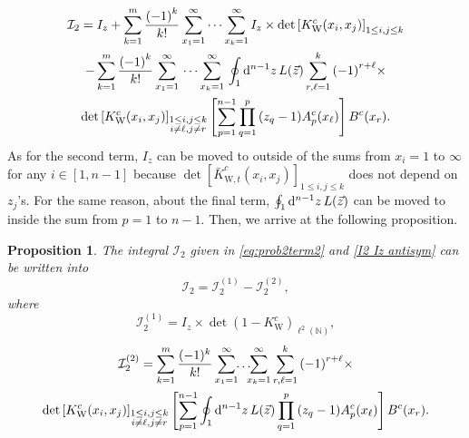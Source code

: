 \documentclass[cmp]{svjour}
\numberwithin{theorem}{section}
\numberwithin{equation}{section}
\def\dd{{\rm d}}
\newtheorem{prop}[theorem]{Proposition}
\begin{document}
\begin{multline*}
\label{detdivide_3}
\mathcal{I}_2 =  I_z + \sum_{k=1}^{m}{ \frac{{(-1)}^k}{k!} } \sum_{x_1 = 1}^{\infty}{  \cdots \sum_{x_k = 1}^{\infty}{ I_z \times \det\left[  K^c_{\mathrm{W}}(x_i , x_j) \right]_{1 \leq i , j \leq k}   }  } \\
-  \sum_{k=1}^{m}{ \frac{{(-1)}^k}{k!} } \sum_{x_1 = 1}^{\infty}{ } \cdots \sum_{x_k = 1}^{\infty}{ } \oint_1 \dd^{n-1} z\,  L(\vec{z}) \sum_{r, \ell =1}^{k}{   {(-1)}^{r+\ell} } \times \\
\det\left[  K^c_{\mathrm{W}}(x_i , x_j) \right]_{ \substack{ 1 \leq i , j \leq k \\  i \neq \ell , j \neq r } }  \left[ \sum_{p=1}^{n-1}{ \prod_{q=1}^{p}{ {(z_q - 1)} A^c_{p}(x_\ell) }} \right]  B^c(x_r) .
\end{multline*}
As for the second term, $I_z$ can be moved to outside of the sums from $x_i = 1$ to $\infty$ for any $i \in [1, n-1]$ because $\det\left[  \bar{K}^c_{\mathrm{W},t}(x_i , x_j) \right]_{1 \leq i , j \leq k}$ does not depend on $z_j$'s.
For the same reason, about the final term, $\oint_1 \dd^{n-1} z\,  L(\vec{z})$ can be moved to inside the sum from $p=1$ to $n-1$.
Then, we arrive at the following proposition.

\medskip


\begin{prop}
The integral $\mathcal{I}_2$ given in \eqref{eq:prob2term2} and \eqref{I2 Iz antisym} can be written into
\begin{equation}
\mathcal{I}_2=\mathcal{I}^{(1)}_2 - \mathcal{I}^{(2)}_2,
\label{I2div}
\end{equation}
where
\begin{equation}
\mathcal{I}^{(1)}_2 = 
I_z \times {\det\left( 1 - K^c_{\mathrm{W}} \right)}_{\ell^2(\mathbb{N})},
\label{def:I2(1)}
\end{equation}
\begin{multline}
\mathcal{I}^{(2)}_2 =  \sum_{k=1}^{m} \frac{(-1)^k}{ k! }
\sum_{x_1 = 1}^{\infty} { \!\! \dots \!\!\! \sum_{x_{k} = 1}^{\infty}
\sum_{r,\ell=1}^{k}{ {(-1)}^{r+\ell} }} \times \\
\det\left[  K^c_{\mathrm{W}}(x_i , x_j) \right]_{ \substack{ 1 \leq i , j \leq k \\  i \neq \ell , j \neq r } } \left[ \sum_{p=1}^{n-1}{  \oint_1 \dd^{n-1} z\,  L(\vec{z}) \prod_{q=1}^{p}{ {(z_q - 1)} A^c_{p}(x_\ell) }} \right]  B^c(x_r).\label{def:I2(2)} 
\end{multline}


\end{prop}
\end{document}
